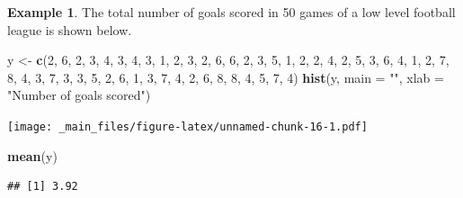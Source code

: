\documentclass[
]{book}
\newenvironment{Shaded}{\begin{snugshade}}{\end{snugshade}}
\newcommand{\AttributeTok}[1]{\textcolor[rgb]{0.13,0.29,0.53}{#1}}
\newcommand{\DecValTok}[1]{\textcolor[rgb]{0.00,0.00,0.81}{#1}}
\newcommand{\FunctionTok}[1]{\textcolor[rgb]{0.13,0.29,0.53}{\textbf{#1}}}
\newcommand{\NormalTok}[1]{#1}
\newcommand{\OtherTok}[1]{\textcolor[rgb]{0.56,0.35,0.01}{#1}}
\newcommand{\StringTok}[1]{\textcolor[rgb]{0.31,0.60,0.02}{#1}}
\theoremstyle{definition}
\theoremstyle{definition}
\newtheorem{example}{Example}[chapter]
\theoremstyle{definition}
\theoremstyle{definition}
\theoremstyle{remark}
\begin{document}
\begin{example}
The total number of goals scored in 50 games of a low level football league is shown below.

\begin{Shaded}
\begin{Highlighting}[]
\NormalTok{y }\OtherTok{\textless{}{-}} \FunctionTok{c}\NormalTok{(}\DecValTok{2}\NormalTok{, }\DecValTok{6}\NormalTok{, }\DecValTok{2}\NormalTok{, }\DecValTok{3}\NormalTok{, }\DecValTok{4}\NormalTok{, }\DecValTok{3}\NormalTok{, }\DecValTok{4}\NormalTok{, }\DecValTok{3}\NormalTok{, }\DecValTok{1}\NormalTok{, }\DecValTok{2}\NormalTok{, }\DecValTok{3}\NormalTok{, }\DecValTok{2}\NormalTok{, }\DecValTok{6}\NormalTok{, }\DecValTok{6}\NormalTok{, }\DecValTok{2}\NormalTok{, }\DecValTok{3}\NormalTok{, }\DecValTok{5}\NormalTok{, }\DecValTok{1}\NormalTok{, }\DecValTok{2}\NormalTok{, }\DecValTok{2}\NormalTok{, }\DecValTok{4}\NormalTok{, }\DecValTok{2}\NormalTok{, }\DecValTok{5}\NormalTok{, }\DecValTok{3}\NormalTok{,}
       \DecValTok{6}\NormalTok{, }\DecValTok{4}\NormalTok{, }\DecValTok{1}\NormalTok{, }\DecValTok{2}\NormalTok{, }\DecValTok{7}\NormalTok{, }\DecValTok{8}\NormalTok{, }\DecValTok{4}\NormalTok{, }\DecValTok{3}\NormalTok{, }\DecValTok{7}\NormalTok{, }\DecValTok{3}\NormalTok{, }\DecValTok{3}\NormalTok{, }\DecValTok{5}\NormalTok{, }\DecValTok{2}\NormalTok{, }\DecValTok{6}\NormalTok{, }\DecValTok{1}\NormalTok{, }\DecValTok{3}\NormalTok{, }\DecValTok{7}\NormalTok{, }\DecValTok{4}\NormalTok{, }\DecValTok{2}\NormalTok{, }\DecValTok{6}\NormalTok{, }\DecValTok{8}\NormalTok{, }\DecValTok{8}\NormalTok{, }\DecValTok{4}\NormalTok{, }\DecValTok{5}\NormalTok{,}
       \DecValTok{7}\NormalTok{, }\DecValTok{4}\NormalTok{)}
\FunctionTok{hist}\NormalTok{(y, }\AttributeTok{main =} \StringTok{""}\NormalTok{, }\AttributeTok{xlab =} \StringTok{"Number of goals scored"}\NormalTok{)}
\end{Highlighting}
\end{Shaded}

\texttt{[image: \_main\_files/figure-latex/unnamed-chunk-16-1.pdf]}

\begin{Shaded}
\begin{Highlighting}[]
\FunctionTok{mean}\NormalTok{(y)}
\end{Highlighting}
\end{Shaded}

\begin{verbatim}
## [1] 3.92
\end{verbatim}


\end{example}
\end{document}
